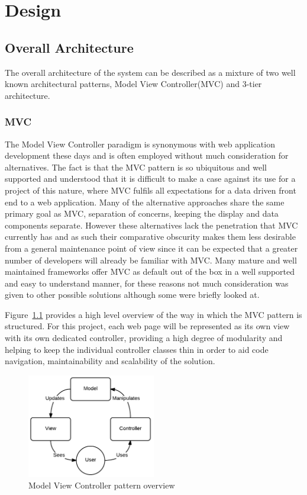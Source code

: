 \chapter{Design}

\section{Overall Architecture}\label{arch}

The overall architecture of the system can be described as a mixture of two well known architectural patterns, Model View Controller(MVC) and 3-tier architecture. 

\subsection{MVC}\label{sec_mvc}

The Model View Controller paradigm is synonymous with web application development these days and is often employed without much consideration for alternatives. The fact is that the MVC pattern is so ubiquitous and well supported and understood that it is difficult to make a case against its use for a project of this nature, where MVC fulfils all expectations for a data driven front end to a web application. Many of the alternative approaches share the same primary goal as MVC, separation of concerns, keeping the display and data components separate. However these alternatives lack the penetration that MVC currently has and as such their comparative obscurity makes them less desirable from a general maintenance point of view since it can be expected that a greater number of developers will already be familiar with MVC. Many mature and well maintained frameworks offer MVC as default out of the box in a well supported and easy to understand manner, for these reasons not much consideration was given to other possible solutions although some were briefly looked at.

Figure~\ref{fig:mvc} provides a high level overview of the way in which the MVC pattern is structured. For this project, each web page will be represented as its own view with its own dedicated controller, providing a high degree of modularity and helping to keep the individual controller classes thin in order to aid code navigation, maintainability and scalability of the solution. 

\begin{figure}[H]
    \centering
    \includegraphics[width=0.5\textwidth]{images/design/mvc}
    \caption{Model View Controller pattern overview}
    \label{fig:mvc}
\end{figure}


